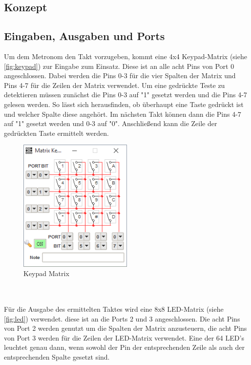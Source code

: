 \documentclass[a4paper, 12pt]{scrartcl}
\begin{document}
\begin{onehalfspace}
\newpage
\section{Konzept}
\subsection{Eingaben, Ausgaben und Ports}
Um dem Metronom den Takt vorzugeben, kommt eine 4x4 Keypad-Matrix (siehe \autoref{fig:keypad}) zur Eingabe zum Einsatz. Diese ist an alle acht Pins von Port 0 angeschlossen. Dabei werden die Pins 0-3 für die vier Spalten der Matrix und Pins 4-7 für die Zeilen der Matrix verwendet. Um eine gedrückte Teste zu detektieren müssen zunächst die Pins 0-3 auf "1" gesetzt werden und die Pins 4-7 gelesen werden. So lässt sich herausfinden, ob überhaupt eine Taste gedrückt ist und welcher Spalte diese angehört. Im nächsten Takt können dann die Pins 4-7 auf "1" gesetzt werden und 0-3 auf "0". Anschließend kann die Zeile der gedrückten Taste ermittelt werden.
\begin{figure}[h]
\centering
\includegraphics[width=0.5\textwidth]{keypad.png}
\caption{Keypad Matrix}
\label{fig:keypad}
\end{figure}
\\
\\
Für die Ausgabe des ermittelten Taktes wird eine 8x8 LED-Matrix (siehe \autoref{fig:led}) verwendet. diese ist an die Ports 2 und 3 angeschlossen. Die acht Pins von Port 2 werden genutzt um die Spalten der Matrix anzusteuern, die acht Pins von Port 3 werden für die Zeilen der LED-Matrix verwendet. Eine der 64 LED's leuchtet genau dann, wenn sowohl der Pin der entsprechenden Zeile als auch der entsprechenden Spalte gesetzt sind.
\begin{figure}[h]
\centering

\end{figure}
\end{onehalfspace}
\end{document}
